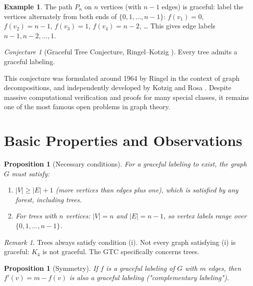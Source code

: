 \documentclass[12pt,a4paper]{amsart}
\newtheorem{proposition}[theorem]{Proposition}
\theoremstyle{definition}
\newtheorem{example}[theorem]{Example}
\theoremstyle{remark}
\newtheorem{remark}[theorem]{Remark}
\newtheorem{conjecture}[theorem]{Conjecture}
\begin{document}
\begin{example}\label{ex:path}
The path $P_n$ on $n$ vertices (with $n-1$ edges) is graceful: label the vertices
alternately from both ends of $\{0, 1, \ldots, n-1\}$:
$f(v_1) = 0$, $f(v_2) = n-1$, $f(v_3) = 1$, $f(v_4) = n-2$, \ldots
This gives edge labels $n-1, n-2, \ldots, 1$.
\end{example}

\begin{conjecture}[Graceful Tree Conjecture, Ringel--Kotzig \cite{RingelKotzig1964}]
\label{conj:gtc}
Every tree admits a graceful labeling.
\end{conjecture}

This conjecture was formulated around 1964 by Ringel in the context of graph
decompositions, and independently developed by Kotzig and Rosa \cite{Rosa1967}.
Despite massive computational verification and proofs for many special classes,
it remains one of the most famous open problems in graph theory.

\section{Basic Properties and Observations}\label{sec:basic}

\begin{proposition}[Necessary conditions]\label{prop:necessary}
For a graceful labeling to exist, the graph $G$ must satisfy:
\begin{enumerate}[label=(\roman*)]
  \item $|V| \geq |E| + 1$ (more vertices than edges plus one), which is satisfied
        by any forest, including trees.
  \item For trees with $n$ vertices: $|V| = n$ and $|E| = n - 1$, so vertex labels
        range over $\{0, 1, \ldots, n-1\}$.
\end{enumerate}
\end{proposition}

\begin{remark}
Trees always satisfy condition (i). Not every graph satisfying (i) is graceful:
$K_4$ is not graceful. The GTC specifically concerns trees.
\end{remark}

\begin{proposition}[Symmetry]\label{prop:symmetry}
If $f$ is a graceful labeling of $G$ with $m$ edges, then $f'(v) = m - f(v)$
is also a graceful labeling ("complementary labeling").
\end{proposition}
\end{document}
